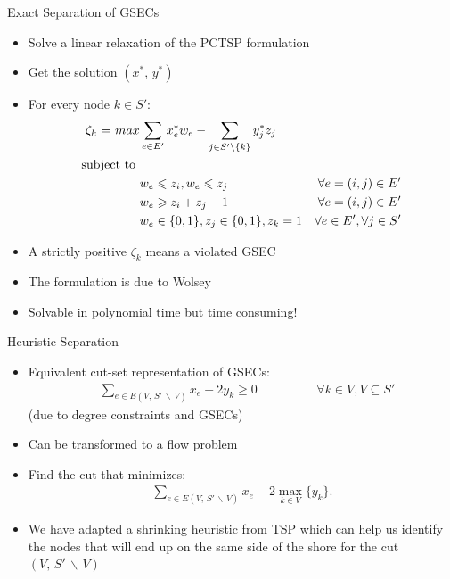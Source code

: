 \documentclass[10pt]{beamer}
\begin{document}
\begin{frame}[fragile]{Exact Separation of GSECs}
\begin{itemize}
    \item<1-> Solve a linear relaxation of the PCTSP formulation
    \item<2-> Get the solution $(x^*, \, y^*)$ 
    \item<3-> For every node $k \in S'$:
    \begin{align} 
        \zeta_k \ \text  = \ {max } \label{sep_obj} & \sum_{e\in E'} x_e^{*} w_e  - \sum_{j \in S' \backslash \{ k \}}  y_j^{*} z_j     &  \\
        \text{subject to }                          & & \nonumber \\
        \label{const:sep1}                          & w_e\leq z_i, w_e\leq z_j  & \forall e =(i,j) \in E' \\
        \label{const:sep2}                          & w_e \geq z_i + z_j - 1    & \forall e = (i,j) \in E' \\
        \label{const:sep3}                          & w_e \in \{0,1\}, z_j \in \{0,1\}, z_k = 1   & \forall e \in E', \forall j \in S'
    \end{align}
    \item<4-> A strictly positive $\zeta_k$ means a violated GSEC
    \item<5-> The formulation is due to Wolsey \cite{Wolsey98}
    \item<6-> Solvable in polynomial time but \alert{time consuming!}
\end{itemize}
\end{frame}

\begin{frame}{Heuristic Separation}
\begin{itemize}
\item<1-> Equivalent cut-set representation of GSECs:
\begin{align}
\label{eq:cut-set}
& \sum_{ e \in E(V, \, S' \, \backslash \, V) } x_{e} - 2 y_{k} \geq 0   \hspace {2cm}   \forall k \in V, V \subseteq S'
\end{align}
(due to degree constraints and GSECs)
\item<2-> Can be transformed to a flow problem 
\item<3->  Find the cut that minimizes:
\begin{align}
\label{eq:min-cut}
\sum_{ e \in E(V, \, S' \, \backslash \, V) } x_{e} - 2 \max_{k \in V} \{ y_{k} \}.
\end{align}
\item<4-> We have adapted a shrinking heuristic from TSP which can help us identify the nodes that will end up on the same side of the \alert{shore} for the cut $(V, \, S' \, \backslash \, V)$
\end{itemize}
\end{frame}
\end{document}

